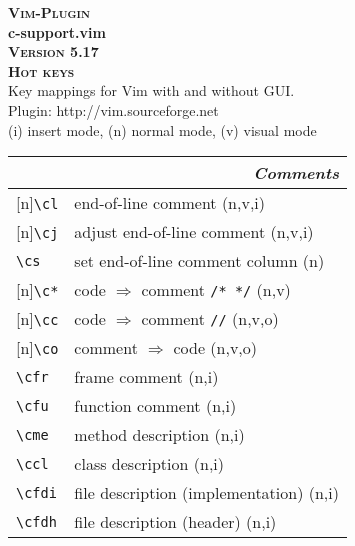 \documentclass[oneside,11pt,landscape,DIV17]{scrartcl}
\newcommand{\Pluginversion}{5.17}
\newcommand{\Rep}{{\tiny{[n]}}}
\begin{document}
%

\begin{multicols}{3}
%
\begin{center}
\textbf{\textsc{\small{Vim-Plugin}}}\\
\textbf{\LARGE{c-support.vim}}\\
\textbf{\textsc{\small{Version \Pluginversion}}}\\
\textbf{\textsc{\Huge{Hot keys}}}\\ 
Key mappings for Vim with and without GUI.\\
Plugin: http://vim.sourceforge.net\\
\vspace{3.0mm}
{\normalsize (i)} insert mode, {\normalsize (n)} normal mode, {\normalsize (v)} visual mode\\
\vspace{5.0mm}
%
\begin{tabular}[]{|p{10mm}|p{60mm}|}
%
\hline
\multicolumn{2}{|r|}{\textsl{\textbf{C}omments}} \\
\hline \Rep\verb'\cl'  & end-of-line comment                     \hfill (n,v,i)\\
\hline \Rep\verb'\cj'  & adjust end-of-line comment              \hfill (n,v,i)\\
\hline     \verb'\cs'  & set end-of-line comment column          \hfill (n)    \\
\hline \Rep\verb'\c*'  & code $\Rightarrow$ comment \verb'/* */' \hfill (n,v)  \\
\hline \Rep\verb'\cc'  & code $\Rightarrow$ comment \verb'//'    \hfill (n,v,o)\\
\hline \Rep\verb'\co'  & comment $\Rightarrow$ code              \hfill (n,v,o)\\

\hline \verb'\cfr' & frame comment                           \hfill (n,i)\\
\hline \verb'\cfu' & function comment                        \hfill (n,i)\\
\hline \verb'\cme' & method description                      \hfill (n,i)\\
\hline \verb'\ccl' & class description                       \hfill (n,i)\\
\hline \verb'\cfdi'& file description (implementation)       \hfill (n,i)\\
\hline \verb'\cfdh'& file description (header)               \hfill (n,i)\\


\end{tabular}
\end{center}
\end{multicols}
\end{document}
